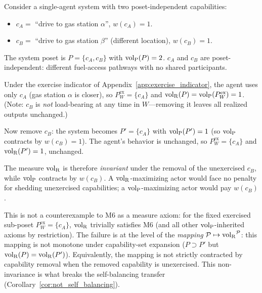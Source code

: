 \begin{example}
\label{ex:volR_removal_invariance}
Consider a single-agent system with two poset-independent
capabilities:
\begin{itemize}
\item $c_A = $ ``drive to gas station $\alpha$'', $w(c_A) = 1$.
\item $c_B = $ ``drive to gas station $\beta$'' (different
  location), $w(c_B) = 1$.
\end{itemize}
The system poset is $P = \{c_A, c_B\}$ with ${\operatorname{vol}_{\mathrm{P}}}(P) = 2$.
$c_A$ and $c_B$ are poset-independent: different
fuel-access pathways with no shared participants.

Under the exercise indicator of
Appendix~\ref{app:exercise_indicator}, the agent uses only $c_A$
(gas station $\alpha$ is closer), so
$P^{\mathrm{ex}}_W = \{c_A\}$ and
${\operatorname{vol}_{\mathrm{R}}}(P) = {\operatorname{vol}_{\mathrm{P}}}(P^{\mathrm{ex}}_W) = 1$.  (Note: $c_B$ is
\emph{not} load-bearing at any time in $W$---removing it leaves
all realized outputs unchanged.)

Now remove $c_B$: the system becomes $P' = \{c_A\}$ with
${\operatorname{vol}_{\mathrm{P}}}(P') = 1$ (so ${\operatorname{vol}_{\mathrm{P}}}$ contracts by $w(c_B) = 1$).  The
agent's behavior is unchanged, so $P^{\mathrm{ex}}_W = \{c_A\}$
and ${\operatorname{vol}_{\mathrm{R}}}(P') = 1$, unchanged.

The measure ${\operatorname{vol}_{\mathrm{R}}}$ is therefore \emph{invariant} under the
removal of the unexercised $c_B$, while ${\operatorname{vol}_{\mathrm{P}}}$ contracts by
$w(c_B)$.  A ${\operatorname{vol}_{\mathrm{R}}}$-maximizing actor would face no penalty for
shedding unexercised capabilities; a ${\operatorname{vol}_{\mathrm{P}}}$-maximizing actor
would pay $w(c_B)$.

This is not a counterexample to M6 as a measure axiom: for the
fixed exercised sub-poset $P^{\mathrm{ex}}_W = \{c_A\}$, ${\operatorname{vol}_{\mathrm{R}}}$
trivially satisfies M6 (and all other ${\operatorname{vol}_{\mathrm{P}}}$-inherited axioms
by restriction).  The failure is at the level of the
\emph{mapping} $\mathcal{P} \mapsto {\operatorname{vol}_{\mathrm{R}}}^{\mathcal{P}}$: this
mapping is not monotone under capability-set expansion
($P \supset P'$ but ${\operatorname{vol}_{\mathrm{R}}}(P) = {\operatorname{vol}_{\mathrm{R}}}(P')$).  Equivalently, the
mapping is not strictly contracted by capability removal when
the removed capability is unexercised.  This non-invariance is
what breaks the self-balancing transfer
(Corollary~\ref{cor:not_self_balancing}).
\end{example}

